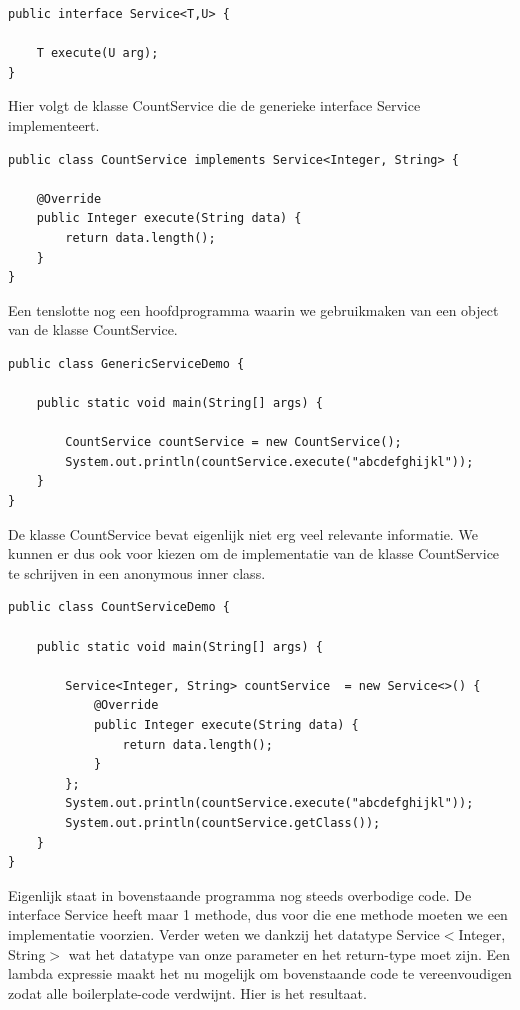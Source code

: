 \documentclass{tstextbook}
\begin{document}
\begin{lstlisting}
public interface Service<T,U> {

	T execute(U arg);
}
\end{lstlisting}

Hier volgt de klasse CountService die de generieke interface Service implementeert.

\begin{lstlisting}
public class CountService implements Service<Integer, String> {

	@Override
	public Integer execute(String data) {
		return data.length();
	}
}
\end{lstlisting}

Een tenslotte nog een hoofdprogramma  waarin we gebruikmaken van een object van de klasse CountService.

\begin{lstlisting}
public class GenericServiceDemo {

	public static void main(String[] args) {

		CountService countService = new CountService();
		System.out.println(countService.execute("abcdefghijkl"));
	}
}
\end{lstlisting}

De klasse CountService bevat eigenlijk niet erg veel relevante informatie.  
We kunnen er dus ook voor kiezen om de implementatie van de klasse CountService te schrijven in een anonymous inner class.

\begin{lstlisting}
public class CountServiceDemo {

	public static void main(String[] args) {

		Service<Integer, String> countService  = new Service<>() {
			@Override
			public Integer execute(String data) {
				return data.length();
			}
		};
		System.out.println(countService.execute("abcdefghijkl"));
		System.out.println(countService.getClass());
	}
}
\end{lstlisting}

Eigenlijk staat in bovenstaande programma nog steeds overbodige code. De interface Service heeft maar 1 methode, dus voor die ene methode moeten we een implementatie voorzien. Verder weten we dankzij het datatype Service$<$Integer, String$>$ wat het datatype van onze parameter en het return-type moet zijn. Een lambda expressie maakt het nu mogelijk om bovenstaande code te vereenvoudigen zodat alle boilerplate-code verdwijnt. Hier is het resultaat.
\end{document}
